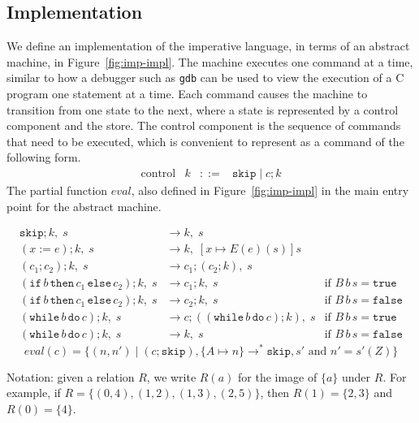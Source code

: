 \documentclass{tufte-handout}
\newcommand{\ASSIGN}[2]{#1 \mathrel{:=} #2}
\newcommand{\SEQ}[2]{#1 \mathrel{;} #2}
\newcommand{\SKIP}[0]{\mathtt{skip}}
\newcommand{\IF}[3]{\mathtt{if}\,#1\,\mathtt{then}\,#2\,\mathtt{else}\,#3}
\newcommand{\WHILE}[2]{\mathtt{while}\,#1\,\mathtt{do}\,#2}
\newcommand{\TRUE}[0]{\mathtt{true}}
\newcommand{\FALSE}[0]{\mathtt{false}}
\begin{document}
\subsection{Implementation}

We define an implementation of the imperative language, in terms of an
abstract machine, in Figure~\ref{fig:imp-impl}. The machine executes
one command at a time, similar to how a debugger such as \texttt{gdb}
can be used to view the execution of a C program one statement at a
time. Each command causes the machine to transition from one state to
the next, where a state is represented by a control component and the
store. The control component is the sequence of commands that need to
be executed, which is convenient to represent as a command of the
following form.
\[
\begin{array}{lrcl}
  \text{control} & k & ::= & \SKIP \mid \SEQ{c}{k}
\end{array}
\]
The partial function $\mathit{eval}$, also defined in
Figure~\ref{fig:imp-impl} in the main entry point for the abstract
machine.


\begin{figure*}

\hfill {}
\begin{align*}
  \SEQ{\SKIP}{k},\; s & \longrightarrow k,\; s \\
  \SEQ{(\ASSIGN{x}{e})}{k},\; s & \longrightarrow k,\; [x\mapsto E(e)(s)]s\\
  \SEQ{(\SEQ{c_1}{c_2})}{k},\; s & \longrightarrow
      \SEQ{c_1}{(\SEQ{c_2}{k})},\; s \\
  \SEQ{(\IF{b}{c_1}{c_2})}{k},\; s & \longrightarrow \SEQ{c_1}{k},\; s
     & \text{if } B\,b\,s = \TRUE \\
  \SEQ{(\IF{b}{c_1}{c_2})}{k},\; s & \longrightarrow \SEQ{c_2}{k},\; s
     & \text{if } B\,b\,s = \FALSE \\
  \SEQ{(\WHILE{b}{c})}{k},\; s & \longrightarrow
      \SEQ{c}{(\SEQ{(\WHILE{b}{c})}{k})},\; s
    & \text{if } B\,b\,s = \TRUE \\
  \SEQ{(\WHILE{b}{c})}{k},\; s & \longrightarrow k,\; s
    & \text{if } B\,b\,s = \FALSE 
\end{align*}
\[
  \mathit{eval}(c) = \{ (n,n') \mid
     (\SEQ{c}{\SKIP}), \{A\mapsto n\}
     \longrightarrow^{*} \SKIP, s'
     \text{ and } n' = s'(Z) \}
\]
\caption{Abstract Machine for IMP}
\label{fig:imp-impl}
\end{figure*}

Notation: given a relation $R$, we write $R(a)$ for the image of
$\{a\}$ under $R$. For example, if $R=\{ (0,4), (1,2), (1,3), (2,5)
\}$, then $R(1) = \{2,3\}$ and $R(0) = \{4\}$.
\end{document}

